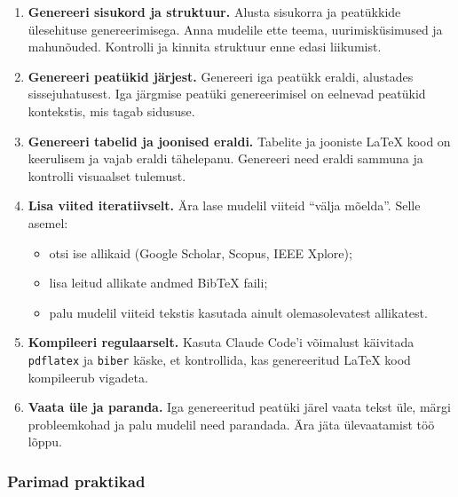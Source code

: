 \begin{enumerate}
    \item \textbf{Genereeri sisukord ja struktuur.} Alusta sisukorra ja peatükkide ülesehituse genereerimisega. Anna mudelile ette teema, uurimisküsimused ja mahunõuded. Kontrolli ja kinnita struktuur enne edasi liikumist.
    \item \textbf{Genereeri peatükid järjest.} Genereeri iga peatükk eraldi, alustades sissejuhatusest. Iga järgmise peatüki genereerimisel on eelnevad peatükid kontekstis, mis tagab sidususe.
    \item \textbf{Genereeri tabelid ja joonised eraldi.} Tabelite ja jooniste \LaTeX{} kood on keerulisem ja vajab eraldi tähelepanu. Genereeri need eraldi sammuna ja kontrolli visuaalset tulemust.
    \item \textbf{Lisa viited iteratiivselt.} Ära lase mudelil viiteid ``välja mõelda''. Selle asemel:
    \begin{itemize}
        \item otsi ise allikaid (Google Scholar, Scopus, IEEE Xplore);
        \item lisa leitud allikate andmed BibTeX faili;
        \item palu mudelil viiteid tekstis kasutada ainult olemasolevatest allikatest.
    \end{itemize}
    \item \textbf{Kompileeri regulaarselt.} Kasuta Claude Code'i võimalust käivitada \texttt{pdflatex} ja \texttt{biber} käske, et kontrollida, kas genereeritud \LaTeX{} kood kompileerub vigadeta.
    \item \textbf{Vaata üle ja paranda.} Iga genereeritud peatüki järel vaata tekst üle, märgi probleemkohad ja palu mudelil need parandada. Ära jäta ülevaatamist töö lõppu.
\end{enumerate}

\subsubsection{Parimad praktikad}

